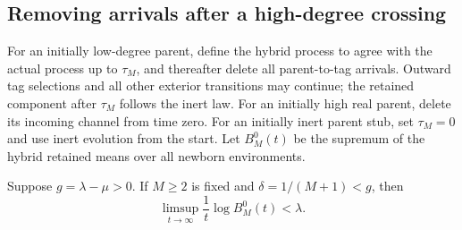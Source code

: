 \subsection{Removing arrivals after a high-degree crossing}

For an initially low-degree parent, define the hybrid process to agree
with the actual process up to $\tau_M$, and thereafter delete all
parent-to-tag arrivals.  Outward tag selections and all other exterior
transitions may continue; the retained component after $\tau_M$ follows
the inert law.  For an initially high real parent, delete its incoming
channel from time zero.  For an initially inert parent stub, set
$\tau_M=0$ and use inert evolution from the start.  Let $B_M^0(t)$ be the supremum of the hybrid
retained means over all newborn environments.

\begin{theorem}\label{pup:hybrid}
Suppose $g=\lambda-\mu>0$.  If $M\ge2$ is fixed and
$\delta=1/(M+1)<g$, then
\begin{equation}\label{pup:hybrid-gap}
 \limsup_{t\to\infty}\frac1t\log B_M^0(t)<\lambda.
\end{equation}
\end{theorem}
